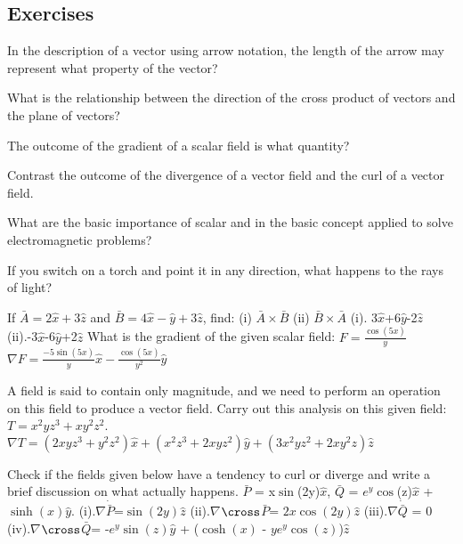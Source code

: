 \begin{mdframed}[ backgroundcolor=lightblue, linewidth=1pt, hidealllines=true]
\section{Exercises}
\begin{ExerciseList}
\Exercise[label={ex161}] 
In the description of a vector using arrow notation, the length of the arrow may represent what property of the vector?

\Exercise[label={ex162}] 
What is the relationship between the direction of the cross product of vectors and the plane of vectors?

\Exercise[label={ex163}] 
The outcome of the gradient of a scalar field is what quantity?

\Exercise[label={ex164}] 
Contrast the outcome of the divergence of a vector field and the curl of a vector field. 

\Exercise[label={ex165}] 
What are the basic importance of scalar and  in the basic concept applied to solve electromagnetic problems?  

\Exercise[label={ex166}] 
If you switch on a torch and point it in any direction, what happens to the rays of light?

\Exercise[label={ex167}] 
If $\bar{A} = 2\hat{x} + 3\hat{z}$ and $\bar{B} = 4\hat{x} - \hat{y} + 3\hat{z}$, find: 
(i) $\bar{A} \times \bar{B}$
(ii) $\bar{B} \times \bar{A}$  
\Answer
(i). 3$\hat{x}$+6$\hat{y}$-2$\hat{z}$
(ii).-3$\hat{x}$-6$\hat{y}$+2$\hat{z}$
\Exercise[label={ex168}] 
What is the gradient of the given scalar field: $F = \frac{\cos(5x)}{y}$
\Answer[ref={ex168}]
$\nabla F = \frac{-5\sin(5x)}{y}\hat{x} - \frac{\cos(5x)}{y^2}\hat{y}$


\Exercise[label={ex169}] 
A field is said to contain only magnitude, and we need to perform an operation on this field to produce a vector field. Carry out this analysis on this given field: $T = x^2yz^3 + xy^2z^2$.
\Answer
$\nabla T= (2xyz^3+y^2z^2)\hat{x}+(x^2z^3+2xyz^2)\hat{y}+(3x^2yz^2+2xy^2z)\hat{z}$

\Exercise[label={ex1610}] 
Check if the fields given below have a tendency to curl or diverge and write a brief discussion on what actually happens.
$\bar{P}$ = x$\sin$(2y)$\hat{x}$, $\bar{Q}$ = $e^{y}$$\cos$(z)$\hat{x}$ + $\sinh(x)$$\hat{y}$.
\Answer
(i).$\nabla$$\dot{\bar{P}}$=$\sin(2y)$$\hat{z}$
(ii).$\nabla$$\cross$$\bar{P}$= $2x\cos(2y)$$\hat{z}$
(iii).$\nabla$$\dot{\bar{Q}}$ = 0
(iv).$\nabla$$\cross$$\bar{Q}$= -$e^{y}$$\sin(z)$$\hat{y}$ + ($\cosh(x)$ - $ye^{y}$$\cos(z)$)$\hat{z}$
\end{ExerciseList}
\end{mdframed}
